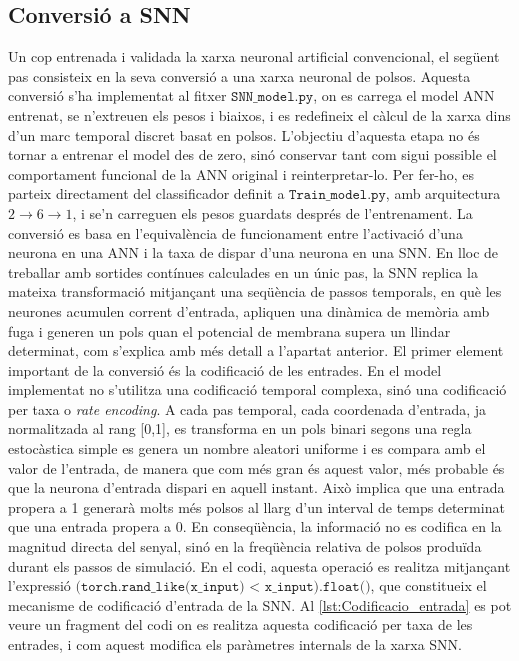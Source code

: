 \documentclass[a4paper,11pt, titlepage, twoside]{article}
\begin{document}
\subsection{Conversió a SNN}
Un cop entrenada i validada la xarxa neuronal artificial convencional, el següent pas consisteix en la seva conversió a una xarxa neuronal de polsos. Aquesta conversió s'ha implementat al fitxer $\texttt{SNN\_model.py}$, on es carrega el model ANN entrenat, se n'extreuen els pesos i biaixos, i es redefineix el càlcul de la xarxa dins d'un marc temporal discret basat en polsos. L'objectiu d'aquesta etapa no és tornar a entrenar el model des de zero, sinó conservar tant com sigui possible el comportament funcional de la ANN original i reinterpretar-lo. Per fer-ho, es parteix directament del classificador definit a $\texttt{Train\_model.py}$, amb arquitectura $2\rightarrow6\rightarrow1$, i se'n carreguen els pesos guardats després de l'entrenament.
La conversió es basa en l'equivalència de funcionament entre l'activació d'una neurona en una ANN i la taxa de dispar d'una neurona en una SNN. En lloc de treballar amb sortides contínues calculades en un únic pas, la SNN replica la mateixa transformació mitjançant una seqüència de passos temporals, en què les neurones acumulen corrent d'entrada, apliquen una dinàmica de memòria amb fuga i generen un pols quan el potencial de membrana supera un llindar determinat, com s'explica amb més detall a l'apartat anterior.
El primer element important de la conversió és la codificació de les entrades. En el model implementat no s'utilitza una codificació temporal complexa, sinó una codificació per taxa o \textit{rate encoding}. A cada pas temporal, cada coordenada d'entrada, ja normalitzada al rang [0,1], es transforma en un pols binari segons una regla estocàstica simple es genera un nombre aleatori uniforme i es compara amb el valor de l'entrada, de manera que com més gran és aquest valor, més probable és que la neurona d'entrada dispari en aquell instant. Això implica que una entrada propera a 1 generarà molts més polsos al llarg d'un interval de temps determinat que una entrada propera a 0. En conseqüència, la informació no es codifica en la magnitud directa del senyal, sinó en la freqüència relativa de polsos produïda durant els passos de simulació. En el codi, aquesta operació es realitza mitjançant l'expressió $\texttt{(torch.rand\_like(x\_input) < x\_input).float()}$, que constitueix el mecanisme de codificació d'entrada de la SNN. Al \autoref{lst:Codificacio_entrada} es pot veure un fragment del codi on es realitza aquesta codificació per taxa de les entrades, i com aquest modifica els paràmetres internals de la xarxa SNN.
\end{document}
